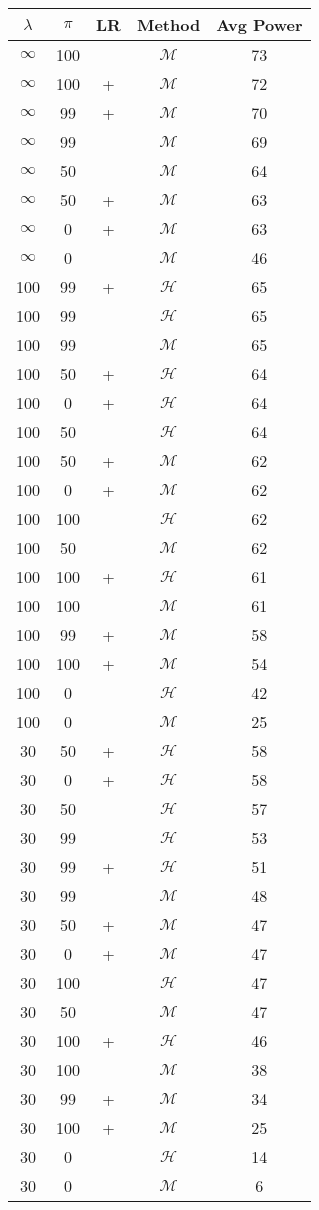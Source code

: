 \centering \begin{tabular}{c|c|c|c|c}
$\lambda$	&$\pi$	&LR	&Method	&Avg Power\\\hline
$\infty$	&100	&	&$\mathcal{M}$	&73\\
$\infty$	&100	&+	&$\mathcal{M}$	&72\\
$\infty$	&99	&+	&$\mathcal{M}$	&70\\
$\infty$	&99	&	&$\mathcal{M}$	&69\\
$\infty$	&50	&	&$\mathcal{M}$	&64\\
$\infty$	&50	&+	&$\mathcal{M}$	&63\\
$\infty$	&0	&+	&$\mathcal{M}$	&63\\
$\infty$	&0	&	&$\mathcal{M}$	&46\\\hline
100	&99	&+	&$\mathcal{H}$	&65\\
100	&99	&	&$\mathcal{H}$	&65\\
100	&99	&	&$\mathcal{M}$	&65\\
100	&50	&+	&$\mathcal{H}$	&64\\
100	&0	&+	&$\mathcal{H}$	&64\\
100	&50	&	&$\mathcal{H}$	&64\\
100	&50	&+	&$\mathcal{M}$	&62\\
100	&0	&+	&$\mathcal{M}$	&62\\
100	&100	&	&$\mathcal{H}$	&62\\
100	&50	&	&$\mathcal{M}$	&62\\
100	&100	&+	&$\mathcal{H}$	&61\\
100	&100	&	&$\mathcal{M}$	&61\\
100	&99	&+	&$\mathcal{M}$	&58\\
100	&100	&+	&$\mathcal{M}$	&54\\
100	&0	&	&$\mathcal{H}$	&42\\
100	&0	&	&$\mathcal{M}$	&25\\\hline
30	&50	&+	&$\mathcal{H}$	&58\\
30	&0	&+	&$\mathcal{H}$	&58\\
30	&50	&	&$\mathcal{H}$	&57\\
30	&99	&	&$\mathcal{H}$	&53\\
30	&99	&+	&$\mathcal{H}$	&51\\
30	&99	&	&$\mathcal{M}$	&48\\
30	&50	&+	&$\mathcal{M}$	&47\\
30	&0	&+	&$\mathcal{M}$	&47\\
30	&100	&	&$\mathcal{H}$	&47\\
30	&50	&	&$\mathcal{M}$	&47\\
30	&100	&+	&$\mathcal{H}$	&46\\
30	&100	&	&$\mathcal{M}$	&38\\
30	&99	&+	&$\mathcal{M}$	&34\\
30	&100	&+	&$\mathcal{M}$	&25\\
30	&0	&	&$\mathcal{H}$	&14\\
30	&0	&	&$\mathcal{M}$	&6\\
\end{tabular}
